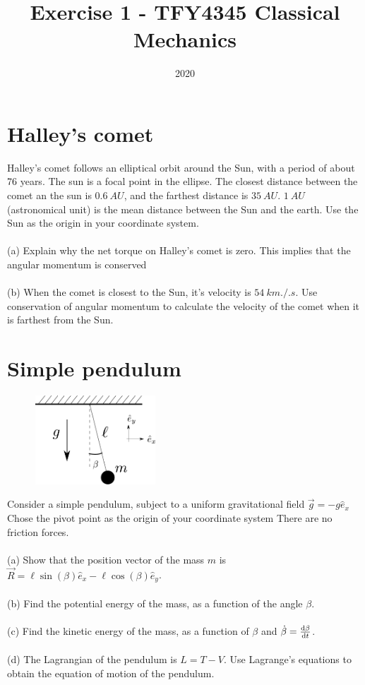 \documentclass{article}
\title{Exercise 1 - TFY4345 Classical Mechanics}
\date{2020}
\begin{document}
    \maketitle
    \section{Halley's comet}
        Halley's comet follows an elliptical orbit around the Sun, with a period of about 76 years. The sun is a focal point in the ellipse. The closest distance between the comet an the sun is $\SI{0.6}{AU}$, and the farthest distance is $ \SI{35}{AU}$. $\SI{1}{AU}$ (astronomical unit) is the mean distance between the Sun and the earth. Use the Sun as the origin in your coordinate system. \\ \\
        (a) Explain why the net torque on Halley's comet is zero. This implies that the angular momentum is conserved \\ \\
        (b) When the comet is closest to the Sun, it's velocity is $\SI{54}{km.\per.s}$. Use conservation of angular momentum to calculate the velocity of the comet when it is farthest from the Sun.

    \section{Simple pendulum}
        \begin{figure}
            \includegraphics[width=0.4\textwidth]{figures/figure_1.pdf}
        \end{figure}
        Consider a simple pendulum, subject to a uniform gravitational field $\vec{g} = -g \hat e_x$ Chose the pivot point as the origin of your coordinate system There are no friction forces. \\ \\
        (a) Show that the position vector of the mass $m$ is $\vec R = \ell \sin(\beta) \hat e_x - \ell \cos(\beta) \hat e_y$.  \\ \\
        (b) Find the potential energy of the mass, as a function of the angle $\beta$. \\ \\
        (c) Find the kinetic energy of the mass, as a function of $\beta$ and $\dot \beta = \dv{\beta}{t}$. \\ \\
        (d) The Lagrangian of the pendulum is $L = T - V$. Use Lagrange's equations to obtain the equation of motion of the pendulum.
        \newpage
\end{document}
